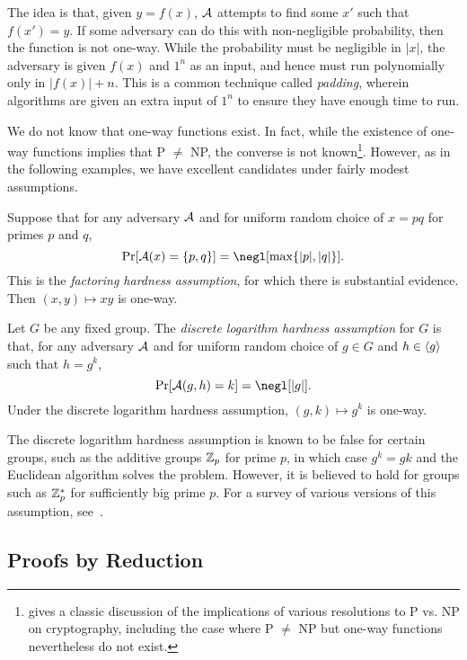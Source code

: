 The idea is that, given $y = f(x)$, $\mathcal{A}$ attempts to find some $x'$ such that
$f(x') = y$. If some adversary can do this with non-negligible probability, then the
function is not one-way. While the probability must be negligible in $|x|$, the
adversary is given $f(x)$ and $1^n$ as an input, and hence must run polynomially
only in $|f(x)| + n$. This is a common technique called \emph{padding}, wherein
algorithms are given an extra input of $1^n$ to ensure they have enough time to
run.

We do not know that one-way functions exist. In fact, while the existence of
one-way functions implies that P $\neq$ NP, the converse is not
known\footnote{\cite{impagliazzo-1995} gives a classic discussion of the
  implications of various resolutions to P vs. NP on cryptography, including the
case where P $\neq$ NP but one-way functions nevertheless do not exist.}.
However, as in the following examples, we have excellent candidates under fairly
modest assumptions.

\begin{ex}
  Suppose that for any adversary $\mathcal{A}$ and for uniform random choice of $x = pq$
  for primes $p$ and $q$, \[
    \Pr[\cA(x) = \{p, q\}] = \negl[\max\{|p|, |q|\}].
  \] This is the \emph{factoring hardness assumption}, for which there is
  substantial evidence. Then $(x,y)\mapsto xy$ is one-way.
\end{ex}

\begin{ex}
  Let $G$ be any fixed group. The \emph{discrete logarithm hardness assumption}
  for $G$ is that, for any adversary $\mathcal{A}$ and for uniform random choice of
  $g\in G$ and $h\in\langle g\rangle$ such that $h = g^k$, \[
    \Pr[\cA(g,h) = k] = \negl[|g|].
  \]
  Under the discrete logarithm hardness assumption, $(g,k)\mapsto g^k$ is one-way.

  The discrete logarithm hardness assumption is known to be false for certain groups, such
  as the additive groups $\mathbb{Z}_p$ for prime $p$, in which case $g^k = gk$ and the
  Euclidean algorithm solves the problem. However, it is believed to hold for
  groups such as $\mathbb{Z}^*_p$ for sufficiently big prime $p$. For a survey of
  various versions of this assumption, see~\cite{sadeghi-steinerr-2002}.
\end{ex}

\subsection{Proofs by Reduction}

